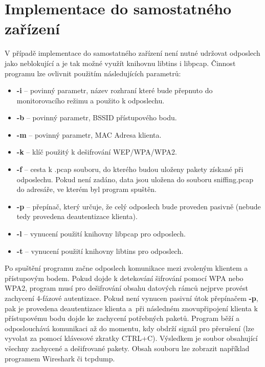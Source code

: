 \section{Implementace do samostatného zařízení}
V případě implementace do samostatného zařízení není nutné udržovat odposlech jako neblokující a je tak možné využít knihovnu libtins i libpcap. Činnost programu lze ovlivnit použitím následujících parametrů: 
\begin{itemize}
  \item{\textbf{-i} -- povinný parametr, název rozhraní které bude přepnuto do monitorovacího režimu a použito k odposlechu.}
  \item{\textbf{-b} -- povinný parametr, BSSID přístupového bodu.}
  \item{\textbf{-m} -- povinný parametr, MAC Adresa klienta.}
  \item{\textbf{-k} -- klíč použitý k dešifrování WEP/WPA/WPA2.}
  \item{\textbf{-f} -- cesta k .pcap souboru, do kterého budou uloženy pakety získané při odposlechu. Pokud není zadáno, data jsou uložena do souboru sniffing.pcap do adresáře, ve kterém byl program spuštěn.}
  \item{\textbf{-p} -- přepínač, který určuje, že celý odposlech bude proveden pasivně (nebude tedy provedena deautentizace klienta).}
  \item{\textbf{-l} -- vynucení použití knihovny libpcap pro odposlech.}
  \item{\textbf{-t} -- vynucení použití knihovny libtins pro odposlech.}
\end{itemize}

Po spuštění programu začne odposlech komunikace mezi zvoleným klientem a přístupovým bodem. Pokud dojde k detekování šifrování pomocí WPA nebo WPA2, program musí pro dešifrování obsahu datových rámců nejprve provést zachycení 4-fázové autentizace. Pokud není vynucen pasivní útok přepínačem \textbf{-p}, pak je provedena deautentizace klienta a~při následném znovupřipojení klienta k přístupovému bodu dojde ke zachycení potřebných paketů. Program běží a odposlouchává komunikaci až do momentu, kdy obdrží signál pro přerušení (lze vyvolat za pomocí klávesové zkratky CTRL+C). Výsledkem je soubor obsahující všechny zachycené a dešifrované pakety. Obsah souboru lze zobrazit například programem Wireshark či tcpdump.

